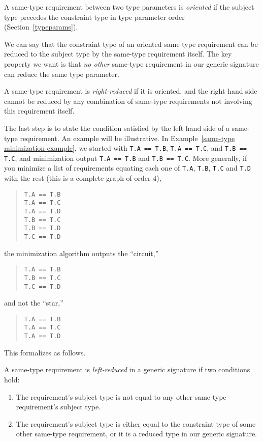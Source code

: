 \documentclass[../generics]{subfiles}
\begin{document}
\begin{definition}
A same-type requirement between two type parameters is \emph{oriented} if the subject type precedes the constraint type in type parameter order (Section~\ref{typeparams}).
\end{definition}
We can say that the constraint type of an oriented same-type requirement can be reduced to the subject type by the same-type requirement itself. The key property we want is that \emph{no other} same-type requirement in our generic signature can reduce the same type parameter.
\begin{definition} A same-type requirement is \emph{right-reduced} if it is oriented, and the right hand side cannot be reduced by any combination of same-type requirements not involving this requirement itself.
\end{definition}
The last step is to state the condition satisfied by the left hand side of a same-type requirement. An example will be illustrative. In Example~\ref{same-type minimization example}, we started with \verb|T.A == T.B|, \verb|T.A == T.C|, and \verb|T.B == T.C|, and minimization output \verb|T.A == T.B| and \verb|T.B == T.C|. More generally, if you minimize a list of requirements equating each one of \texttt{T.A}, \texttt{T.B}, \texttt{T.C} and \texttt{T.D} with the rest (this is a complete graph of order 4),
\begin{quote}
\begin{verbatim}
T.A == T.B
T.A == T.C
T.A == T.D
T.B == T.C
T.B == T.D
T.C == T.D
\end{verbatim}
\end{quote}
the minimization algorithm outputs the ``circuit,''
\begin{quote}
\begin{verbatim}
T.A == T.B
T.B == T.C
T.C == T.D
\end{verbatim}
\end{quote}
and not the ``star,''
\begin{quote}
\begin{verbatim}
T.A == T.B
T.A == T.C
T.A == T.D
\end{verbatim}
\end{quote}
This formalizes as follows.
\begin{definition}\label{left-reduced requirement} A same-type requirement is \emph{left-reduced} in a generic signature if two conditions hold:
\begin{enumerate}
\item The requirement's subject type is not equal to any other same-type requirement's subject type.
\item The requirement's subject type is either equal to the constraint type of some other same-type requirement, or it is a reduced type in our generic signature.
\end{enumerate}
\end{definition}
\end{document}
